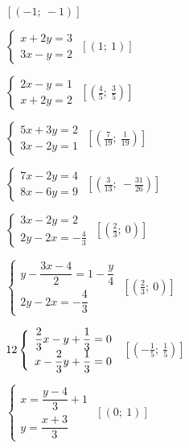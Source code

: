 \begin{esercizio}[*]
\begin{htmulticols}{2}
\begin{enumeratea}
 \hfill \(\left[(-1;~-1)\right]\)
\item \(\left\{\begin{array}{l}x+2y=3 \\3x-y=2\end{array}\right.\)
 \hfill \(\left[(1;~1)\right]\)
\item \(\left\{\begin{array}{l}2x-y=1 \\x+2y=2\end{array}\right.\)
 \hfill \(\left[\left(\frac{4}{5};~\frac{3}{5}\right)\right]\)
\item \(\left\{\begin{array}{l}5x+3y=2 \\3x-2y=1\end{array}\right.\)
 \hfill \(\left[\left(\frac{7}{19};~\frac{1}{19}\right)\right]\)
\item \(\left\{\begin{array}{l}7x-2y=4\\8x-6y=9 \end{array}\right.\)
 \hfill \(\left[\left(\frac{3}{13};~-\frac{31}{26}\right)\right]\)
\item \(\left\{\begin{array}{l}3x-2y=2\\2y-2x=-{\frac{4}{3}} 
\end{array}\right.\)
 \hfill \(\left[(\frac{2}{3};~0)\right]\)
\item \(\left\{\begin{array}{l}
y-\dfrac{3x-4}{2}=1-\dfrac{y}{4}\\
2y-2x=-{\dfrac{4}{3}}\end{array}\right.\)
 \hfill \(\left[\left(\frac{2}{3};~0\right)\right]\)
\item \(\arraystretch{2}\left\{\begin{array}{l}
\dfrac{2}{3}x-y+\dfrac{1}{3}=0\\
x-\dfrac{2}{3}y+\dfrac{1}{3}=0\end{array}\right.\)
 \hfill \(\left[\left(-{\frac{1}{5}};~\frac{1}{5}\right)\right]\)
\item \(\left\{\begin{array}{l}
x=\dfrac{y-4}{3}+1\\
y=\dfrac{x+3}{3}\end{array}\right.\)
 \hfill \(\left[(0;~1)\right]\)
\end{enumeratea}
\end{htmulticols}
\end{esercizio}


